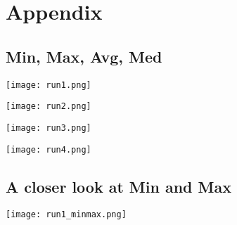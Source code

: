 \section{Appendix}

\subsection{Min, Max, Avg, Med}
\begin{center}
\texttt{[image: run1.png]}%
\label{fig:Run1}%
\end{center}

\begin{center}
\texttt{[image: run2.png]}%
\label{fig:Run2}%
\end{center}

\begin{center}
\texttt{[image: run3.png]}%
\label{fig:Run3}%
\end{center}

\begin{center}
\texttt{[image: run4.png]}%
\label{fig:Run4}%
\end{center}
%
%
%


\subsection{A closer look at Min and Max}
\begin{center}
\texttt{[image: run1\_minmax.png]}%
\label{fig:Run1_minmax}%
\end{center}

